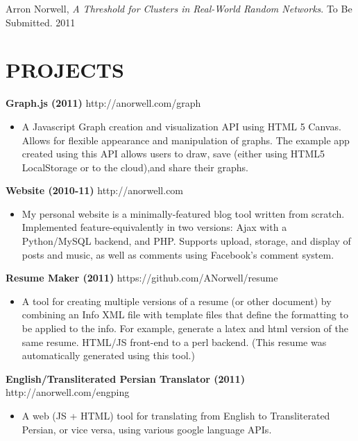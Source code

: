 \documentclass[line,margin]{res}
\begin{document}
\begin{resume}
    Arron Norwell, {\sl A Threshold for Clusters in Real-World Random Networks}. To Be Submitted.  \hfill 2011 \\
  

\section{PROJECTS}

{\bf Graph.js (2011)} \hfill http://anorwell.com/graph
                 \begin{itemize}  \itemsep -2pt %
                 \item A Javascript Graph creation and visualization API using HTML 5 Canvas. Allows for flexible appearance and manipulation of graphs.  The example app created using this API allows users to draw, save (either using HTML5 LocalStorage or to the cloud),and share their graphs. 
                \end{itemize}
  
{\bf Website (2010-11)} \hfill http://anorwell.com
                 \begin{itemize}  \itemsep -2pt %
                 \item My personal website is a minimally-featured blog tool written from scratch. Implemented feature-equivalently in two versions: Ajax with a Python/MySQL backend, and PHP.  Supports upload, storage, and display of posts and music, as well as comments using Facebook's comment system. 
                \end{itemize}
  
{\bf Resume Maker (2011)} \hfill https://github.com/ANorwell/resume
                 \begin{itemize}  \itemsep -2pt %
                 \item A tool for creating multiple versions of a resume (or other document) by combining an Info XML file with template files that define the formatting to be applied to the info. For example, generate a latex and html version of the same resume. HTML/JS front-end to a perl backend. (This resume was automatically generated using this tool.)
                \end{itemize}
  
{\bf English/Transliterated Persian Translator (2011)} \hfill http://anorwell.com/engping
                 \begin{itemize}  \itemsep -2pt %
                 \item A web (JS + HTML) tool for translating from English to Transliterated Persian, or vice versa, using various google language APIs.
                \end{itemize}
  

\end{resume}
\end{document}
